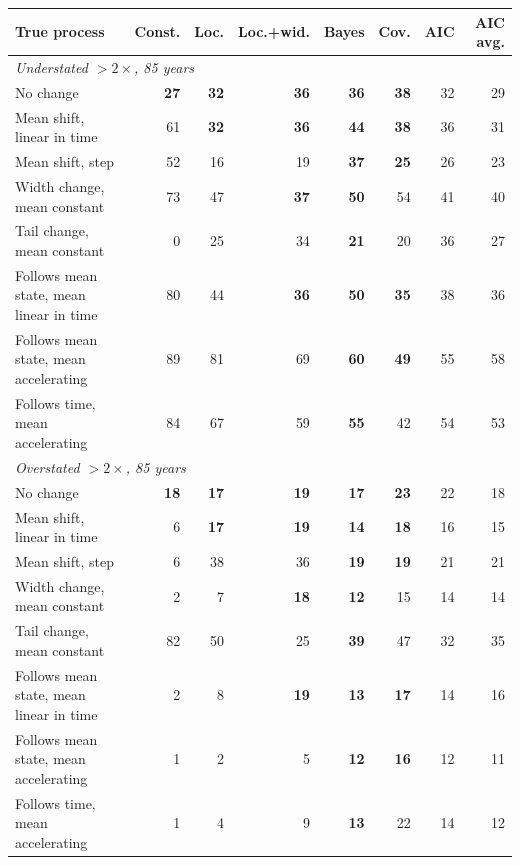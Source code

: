 \begin{tabular}{lrrrrrrr}
\toprule
True process & Const. & Loc. & Loc.+wid. & Bayes & Cov. & AIC & AIC avg. \\
\midrule
\multicolumn{8}{l}{\emph{Understated $>2\times$, 85 years}} \\
No change & \textbf{27} & \textbf{32} & \textbf{36} & \textbf{36} & \textbf{38} & 32 & 29 \\
Mean shift, linear in time & 61 & \textbf{32} & \textbf{36} & \textbf{44} & \textbf{38} & 36 & 31 \\
Mean shift, step & 52 & 16 & 19 & \textbf{37} & \textbf{25} & 26 & 23 \\
Width change, mean constant & 73 & 47 & \textbf{37} & \textbf{50} & 54 & 41 & 40 \\
Tail change, mean constant & 0 & 25 & 34 & \textbf{21} & 20 & 36 & 27 \\
Follows mean state, mean linear in time & 80 & 44 & \textbf{36} & \textbf{50} & \textbf{35} & 38 & 36 \\
Follows mean state, mean accelerating & 89 & 81 & 69 & \textbf{60} & \textbf{49} & 55 & 58 \\
Follows time, mean accelerating & 84 & 67 & 59 & \textbf{55} & 42 & 54 & 53 \\
\multicolumn{8}{l}{\emph{Overstated $>2\times$, 85 years}} \\
No change & \textbf{18} & \textbf{17} & \textbf{19} & \textbf{17} & \textbf{23} & 22 & 18 \\
Mean shift, linear in time & 6 & \textbf{17} & \textbf{19} & \textbf{14} & \textbf{18} & 16 & 15 \\
Mean shift, step & 6 & 38 & 36 & \textbf{19} & \textbf{19} & 21 & 21 \\
Width change, mean constant & 2 & 7 & \textbf{18} & \textbf{12} & 15 & 14 & 14 \\
Tail change, mean constant & 82 & 50 & 25 & \textbf{39} & 47 & 32 & 35 \\
Follows mean state, mean linear in time & 2 & 8 & \textbf{19} & \textbf{13} & \textbf{17} & 14 & 16 \\
Follows mean state, mean accelerating & 1 & 2 & 5 & \textbf{12} & \textbf{16} & 12 & 11 \\
Follows time, mean accelerating & 1 & 4 & 9 & \textbf{13} & 22 & 14 & 12 \\
\bottomrule
\end{tabular}
